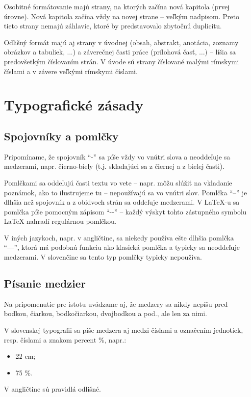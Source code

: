 Osobitné formátovanie majú strany, na ktorých začína nová kapitola (prvej úrovne). Nová kapitola začína vždy na novej strane -- veľkým nadpisom. Preto tieto strany nemajú záhlavie, ktoré by predstavovalo zbytočnú duplicitu.

Odlišný formát majú aj strany v úvodnej (obsah, abstrakt, anotácia, zoznamy obrázkov a tabuliek, ...) a záverečnej časti práce (prílohová časť, ...) -- líšia sa predovšetkým číslovaním strán. V úvode sú strany číslované malými rímskymi číslami a v závere veľkými rímskymi číslami.

\section{Typografické zásady}
\label{sec:typograficke_zasady}


\subsection{Spojovníky a pomlčky}
\label{sec:spojovniky_pomlcky}

Pripomíname, že spojovník \enquote{-} sa píše vždy vo vnútri slova a neoddeľuje sa medzerami, napr. čierno-biely (t.j. skladajúci sa z čiernej a z bielej časti).

Pomlčkami sa oddeľujú časti textu vo vete -- napr. môžu slúžiť na vkladanie poznámok, ako to ilustrujeme tu -- nepoužívajú sa vo vnútri slov. Pomlčka \enquote{--} je dlhšia než spojovník a z obidvoch strán sa oddeľuje medzerami. V LaTeX-u sa pomlčka píše pomocným zápisom \enquote{{-}{-}} -- každý výskyt tohto zástupného symbolu LaTeX nahradí regulárnou pomlčkou.

V iných jazykoch, napr. v angličtine, sa niekedy používa ešte dlhšia pomlčka \enquote{---}, ktorá má podobnú funkciu ako klasická pomlčka a typicky sa neoddeľuje medzerami. V slovenčine sa tento typ pomlčky typicky nepoužíva.

\subsection{Písanie medzier}

Na pripomenutie pre istotu uvádzame aj, že medzery sa nikdy nepíšu pred bodkou, čiarkou, bodkočiarkou, dvojbodkou a pod., ale len za nimi.

V slovenskej typografii sa píše medzera aj medzi číslami a označením jednotiek, resp. číslami a znakom percent \%, napr.:
\begin{itemize}
\item 22 cm;
\item 75 \%.
\end{itemize}
V angličtine sú pravidlá odlišné.

